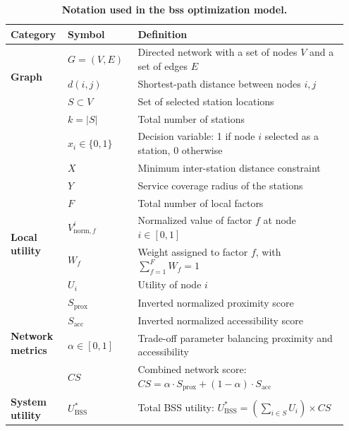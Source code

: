     \begin{table}[!htbp]
        \centering
        \caption[Notation used in the BSS station-planning model]{
            \textbf{Notation used in the \ac{bss} optimization model.}
        }
        \label{table:notation}
        \footnotesize
        \begin{tabular}{p{0.15\linewidth}p{0.20\linewidth}p{0.60\linewidth}}
            \toprule
            \textbf{Category} & \textbf{Symbol} & \textbf{Definition} \\
            \midrule
            \multirow{3}{*}[0.5em]{\textbf{Graph}} 
            & $G=(V,E)$ & Directed network with a set of nodes $V$ and a set of edges $E$ \\
            & $d(i,j)$ & Shortest-path distance between nodes $i,j$ \\
            \midrule
            \multirow{5}{*}[0.5em]{\textbf{Stations}} 
            & $S \subset V$ & Set of selected station locations \\
            & $k = |S|$ & Total number of stations \\
            & $x_i \in \{0,1\}$ & Decision variable: 1 if node $i$ selected as a station, 0 otherwise \\
            & $X$ & Minimum inter-station distance constraint \\
            & $Y$ & Service coverage radius of the stations \\
            \midrule
            \multirow{4}{*}[0.5em]{\textbf{Local utility}} 
            & $F$ & Total number of local factors \\
            & $V_{\mathrm{norm},f}^i$ & Normalized value of factor $f$ at node $i \in [0,1]$ \\
            & $W_f$ & Weight assigned to factor $f$, with $\sum_{f=1}^F W_f = 1$ \\
            & $U_i$ & Utility of node $i$ \\
            \midrule
            \multirow{4}{*}[0.5em]{\textbf{Network metrics}} 
            & $S_{\mathrm{prox}}$ & Inverted normalized proximity score \\
            & $S_{\mathrm{acc}}$ & Inverted normalized accessibility score \\
            & $\alpha \in [0,1]$ & Trade-off parameter balancing proximity and accessibility \\
            & $CS$ & Combined network score: $CS = \alpha \cdot S_{\mathrm{prox}} + (1-\alpha) \cdot S_{\mathrm{acc}}$ \\
            \midrule
            \textbf{System utility} & $U^*_{\mathrm{BSS}}$ & Total BSS utility: $U^*_{\mathrm{BSS}} = \left(\sum_{i \in S} U_i\right) \times CS$ \\
            \bottomrule
        \end{tabular}
        \end{table}
    

